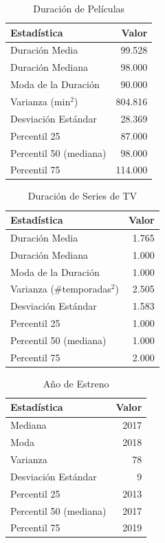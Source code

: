 \documentclass{article}
\begin{document}
\begin{table}[H]
    \centering
    \begin{tabular}{|l|r|}
    \hline
    \textbf{Estadística} & \textbf{Valor} \\
    \hline
    Duración Media & 99.528 \\
    Duración Mediana & 98.000 \\
    Moda de la Duración & 90.000 \\
    Varianza (min$^2$) & 804.816 \\
    Desviación Estándar & 28.369 \\
    Percentil 25 & 87.000 \\
    Percentil 50 (mediana) & 98.000 \\
    Percentil 75 & 114.000 \\
    \hline
    \end{tabular}
    \caption{Duración de Películas}
    \label{tab:estadisticas_duracion_peliculas}
\end{table}

\begin{table}[H]
    \centering
    \begin{tabular}{|l|r|}
    \hline
    \textbf{Estadística} & \textbf{Valor} \\
    \hline
    Duración Media & 1.765 \\
    Duración Mediana & 1.000 \\
    Moda de la Duración & 1.000 \\
    Varianza (\#temporadas$^2$) & 2.505 \\
    Desviación Estándar & 1.583 \\
    Percentil 25 & 1.000 \\
    Percentil 50 (mediana) & 1.000 \\
    Percentil 75 & 2.000 \\
    \hline
    \end{tabular}
    \caption{Duración de Series de TV}
    \label{tab:estadisticas_duracion_series}
\end{table}

\begin{table}[H]
    \centering
    \begin{tabular}{|l|r|}
    \hline
    \textbf{Estadística} & \textbf{Valor} \\
    \hline
    Mediana & 2017 \\
    Moda & 2018 \\
    Varianza & 78 \\
    Desviación Estándar & 9 \\
    Percentil 25 & 2013 \\
    Percentil 50 (mediana) & 2017 \\
    Percentil 75 & 2019 \\
    \hline
    \end{tabular}
    \caption{Año de Estreno}
    \label{tab:estadisticas_estreno}
\end{table}
\end{document}
